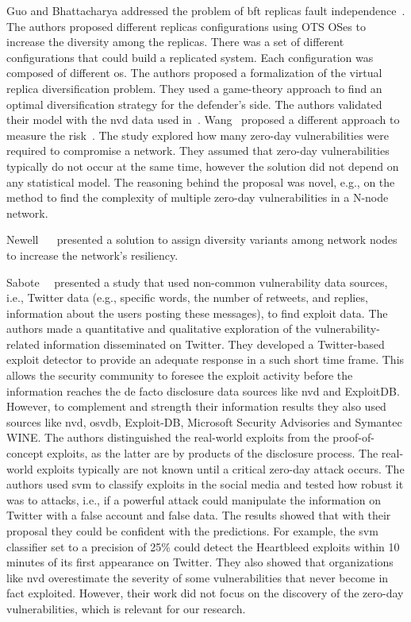 Guo and Bhattacharya addressed the problem of \gls{bft} replicas fault independence~\cite{Guo:2014}.
The authors proposed different replicas configurations using OTS OSes to increase the diversity among the replicas. 
There was a set of different configurations that could build a replicated system. 
Each configuration was composed of different \gls{os}. 
The authors proposed a formalization of the virtual replica diversification problem. 
They used a game-theory approach to find an optimal diversification strategy for the defender's side. 
The authors validated their model with the \gls{nvd} data used in~\cite{Garcia:2012}.
Wang~\etal{} proposed a different approach to measure the risk~\cite{Wang:2014}. 
The study explored how many zero-day vulnerabilities were required to compromise a network. 
They assumed that zero-day vulnerabilities typically do not occur at the same time, however the solution did not depend on any statistical model. 
The reasoning behind the proposal was novel, e.g., on the method to find the complexity of multiple zero-day vulnerabilities in a N-node network.

Newell~\etal{} ~\cite{Newell:2015} presented a solution to assign diversity variants among network nodes to increase the network's resiliency.

Sabote~\etal{}~\cite{Sabottke:2015} presented a study that used non-common vulnerability data sources, i.e., Twitter data (e.g., specific words, the number of retweets, and replies, information about
the users posting these messages), to find exploit data. 
The authors made a quantitative and qualitative exploration of the vulnerability-related information disseminated on Twitter.
They developed a Twitter-based exploit detector to provide an adequate response in a such short time frame. 
This allows the security community to foresee the exploit activity before the information reaches the de facto disclosure data sources like \gls{nvd} and ExploitDB.
However, to complement and strength their information results they also used sources like \gls{nvd}, \gls{osvdb}, Exploit-DB, Microsoft Security Advisories and Symantec WINE. 
The authors distinguished the real-world exploits from the proof-of-concept exploits, as the latter are by products of the disclosure process. 
The real-world exploits typically are not known until a critical zero-day attack occurs. 
The authors used \gls{svm} to classify exploits in the social media and tested how robust it was to attacks, i.e., if a powerful attack could manipulate the information on Twitter with a false account and false data. 
The results showed that with their proposal they could be confident with the predictions. 
For example, the \gls{svm} classifier set to a precision of 25\% could detect the Heartbleed exploits within 10 minutes of its first appearance on Twitter. 
They also showed that organizations like \gls{nvd} overestimate the severity of some vulnerabilities that never become in fact exploited.
However, their work did not focus on the discovery of the zero-day vulnerabilities, which is relevant for our research.

